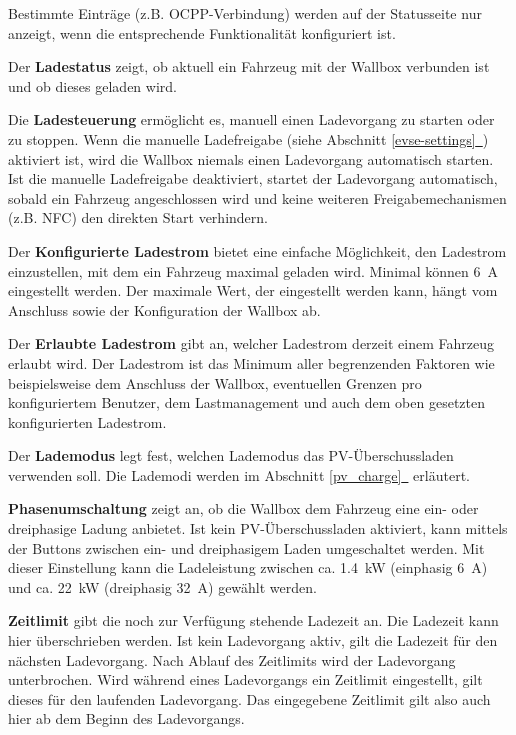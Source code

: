 \documentclass[a4paper,10pt]{article}
\newcommand*{\fullref}[1]{Abschnitt \hyperref[{#1}]{\ref*{#1}~\nameref*{#1}}}
\begin{document}
\begin{multicols*}{2}
    Bestimmte Einträge (z.B. OCPP-Verbindung) werden auf der Statusseite nur anzeigt, wenn die entsprechende
    Funktionalität konfiguriert ist.

    Der \textbf{Ladestatus} zeigt, ob aktuell ein
    Fahrzeug mit der Wallbox verbunden ist und ob dieses geladen wird.

    Die \textbf{Ladesteuerung} ermöglicht es, manuell einen Ladevorgang zu
    starten oder zu stoppen. Wenn die manuelle Ladefreigabe (siehe \fullref{evse-settings}) aktiviert ist, wird die
    Wallbox niemals einen Ladevorgang automatisch starten.
    Ist die manuelle Ladefreigabe deaktiviert,
    startet der Ladevorgang automatisch, sobald ein Fahrzeug
    angeschlossen wird und keine weiteren Freigabemechanismen (z.B. NFC) den
    direkten Start verhindern.

    Der \textbf{Konfigurierte Ladestrom} bietet eine einfache Möglichkeit, den
	Ladestrom einzustellen, mit dem ein Fahrzeug maximal geladen wird.
	Minimal können \SI{6}{\ampere} eingestellt werden. Der maximale Wert, der eingestellt werden kann, hängt vom Anschluss sowie der Konfiguration der Wallbox ab.

    Der \textbf{Erlaubte Ladestrom} gibt an, welcher Ladestrom derzeit einem Fahrzeug erlaubt
    wird. Der Ladestrom ist das Minimum aller begrenzenden Faktoren wie
    beispielsweise dem Anschluss der Wallbox, eventuellen Grenzen pro konfiguriertem Benutzer,
    dem Lastmanagement und auch dem oben gesetzten konfigurierten Ladestrom.

    Der \textbf{Lademodus} legt fest, welchen Lademodus das PV-Überschussladen verwenden soll. Die Lademodi werden im \fullref{pv_charge} erläutert.

	\textbf{Phasenumschaltung} zeigt an, ob die Wallbox dem Fahrzeug eine
	ein- oder dreiphasige Ladung anbietet. Ist kein PV-Überschussladen
	aktiviert, kann mittels der Buttons
	zwischen ein- und dreiphasigem Laden umgeschaltet werden. Mit dieser Einstellung kann die Ladeleistung zwischen ca. \SI{1,4}{\kilo\watt}
	(einphasig \SI{6}{\ampere}) und ca. \SI{22}{\kilo\watt}
	(dreiphasig \SI{32}{\ampere}) gewählt werden.

    \textbf{Zeitlimit} gibt die noch zur Verfügung stehende Ladezeit an.
	Die Ladezeit kann hier überschrieben werden. Ist kein Ladevorgang
	aktiv, gilt die Ladezeit für den nächsten Ladevorgang. Nach Ablauf des
	Zeitlimits wird der Ladevorgang unterbrochen. Wird während eines Ladevorgangs ein Zeitlimit
	eingestellt, gilt dieses für den laufenden Ladevorgang.
	Das eingegebene Zeitlimit gilt also auch hier ab dem Beginn des Ladevorgangs.


\end{multicols*}
\end{document}

